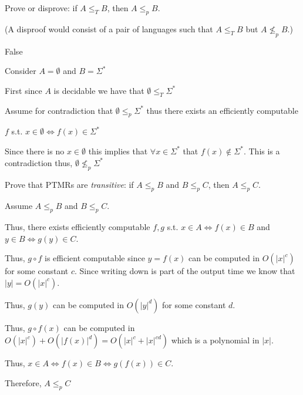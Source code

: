 \documentclass[12pt, letterpaper]{article}
\begin{document}
\begin{subproblem}{}
    Prove or disprove: if $A \leq_T B$, then $A \leq_p B$. 
    
   (A disproof would consist of a pair of languages such that $A \leq_T B$ but $A \not \leq_p B$.)
\end{subproblem}
\begin{problemproof}
    False 

   Consider $A=\emptyset$ and $B = \Sigma^*$

   First since $A$ is decidable we have that $\emptyset \leq_T \Sigma^*$

   Assume for contradiction that $\emptyset \leq_p \Sigma^*$ thus there exists an efficiently computable 
   
   $f$ s.t. $x \in \emptyset \iff f(x) \in \Sigma^*$

   Since there is no $x \in \emptyset$ this implies that $\forall x \in \Sigma^*$ that $f(x) \notin \Sigma^*$. This is a contradiction thus, $\emptyset \not \leq_p \Sigma^*$
\end{problemproof}
\newcommand{\ptimemap}{\leq_p}
\begin{subproblem}{}
    Prove that PTMRs are \emph{transitive}: if $A \ptimemap B$ and $B \ptimemap C$, then $A \ptimemap C$.
\end{subproblem}
\begin{problemproof}
    Assume $A \leq_p B$ and $B \leq_p C$.

    Thus, there exists efficiently computable $f,g$ s.t. $x \in A \iff f(x) \in B$ and $y \in B \iff g(y) \in C$.

    Thus, $g \circ f$ is efficient computable since $y=f(x)$ can be computed in $O(|x|^c)$ for some constant $c$. Since writing down is part of the output time we know that $|y|=O(|x|^c)$.

    Thus, $g(y)$ can be computed in $O(|y|^d)$ for some constant $d$.

    Thus, $g\circ f(x)$ can be computed in $O(|x|^c)+O(|f(x)|^d)=O(|x|^c+|x|^{cd})$ which is a polynomial in $|x|$.

    Thus, $x \in A \iff f(x) \in B \iff g(f(x)) \in C$.

    Therefore, $A \leq_p C$
\end{problemproof}
\end{document}
